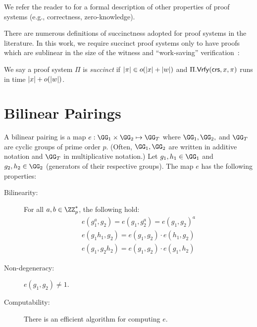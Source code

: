 We refer the reader to \cite{Thaler23,GoldreichFoC} for a formal description of other properties of proof systems (e.g., correctness, zero-knowledge). 

There are numerous definitions of succinctness adopted for proof systems in the literature. In this work, we require succinct proof systems only to have proofs which are sublinear in the size of the witness and ``work-saving'' verification~\cite{snark-misconceptions}:

\begin{definition}[succinctness]
    We say a proof system $\Pi$ is \emph{succinct} if $\lvert \pi \rvert \in o(\lvert x \rvert + \lvert w \rvert)$ and $\Pi.\mathsf{Vrfy}(\mathsf{crs}, x, \pi)$ runs in time $\lvert x \rvert + o(\lvert w \rvert)$.
\end{definition}


\section{Bilinear Pairings}\label{sec:pairings}

\begin{definition}
   A bilinear pairing is a map $e : \GG_1 \times \GG_2 \mapsto \GG_T$ where $\GG_1, \GG_2,$ and $\GG_T$ are cyclic groups of prime order $p$. (Often, $\GG_1,\GG_2$ are written in additive notation and $\GG_T$ in multiplicative notation.) Let $g_1,h_1 \in \GG_1$ and $g_2,h_2 \in \GG_2$ (generators of their respective groups). The map $e$ has the following properties:
   \begin{description}
       \item[Bilinearity:] For all $a,b \in \ZZ_p^*$, the following hold:
       \begin{align*}
           e(g_1^a, g_2) = e(g_1, g_2^a) = e(g_1, g_2)^a\\
           e(g_1 h_1, g_2) = e(g_1, g_2) \cdot e(h_1, g_2)\\
           e(g_1, g_2 h_2) = e(g_1, g_2) \cdot e(g_1, h_2)
        \end{align*}
        \item[Non-degeneracy:] $e(g_1, g_2) \neq 1$.
        \item[Computability:] There is an efficient algorithm for computing $e$.
    \end{description}
\end{definition}


